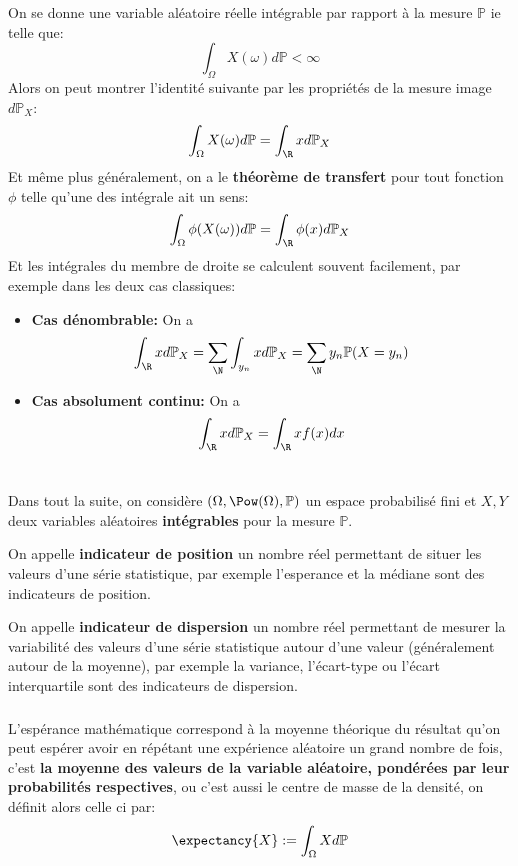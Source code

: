 \subsection*{}
On se donne une variable aléatoire réelle intégrable par rapport à la mesure \( \mathbb{P} \) ie telle que:
\[ 
   \int_\Omega X( \omega)d \mathbb{P} < \infty 
\] 
Alors on peut montrer l'identité suivante par les propriétés de la mesure image \( d \mathbb{P}_X \):
\[ 
   \int_\Omega X( \omega) d \mathbb{P} = \int_{\R} xd \mathbb{P}_X
\]
Et même plus généralement, on a le \textbf{théorème de transfert} pour tout fonction \( \phi \) telle qu'une des intégrale ait un sens:
\[ 
   \int_\Omega \phi(X( \omega)) d \mathbb{P} = \int_{\R} \phi(x)d \mathbb{P}_X
\]
Et les intégrales du membre de droite se calculent souvent facilement, par exemple dans les deux cas classiques:
\begin{itemize}
   \item \textbf{Cas dénombrable:} On a 
   \[ 
      \int_{\R} xd \mathbb{P}_X = \sum_\N \int_{y_n} xd \mathbb{P}_X = \sum_\N y_n \mathbb{P}(X = y_n)
   \]
   \item \textbf{Cas absolument continu:} On a 
   \[ 
      \int_{\R} xd \mathbb{P}_X = \int_{\R}xf(x)dx  
   \]
\end{itemize}
\chapter*{} %
Dans tout la suite, on considère \((\Omega, \Pow(\Omega), \mathbb{P})\) un espace probabilisé fini et \(X, Y\) deux variables aléatoires \textbf{intégrables} pour la mesure \( \mathbb{P} \). \<

On appelle \textbf{indicateur de position} un nombre réel permettant de situer les valeurs d'une série statistique, par exemple l'esperance et la médiane sont des indicateurs de position.\+

On appelle \textbf{indicateur de dispersion} un nombre réel permettant de mesurer la variabilité des valeurs d'une série statistique autour d'une valeur (généralement autour de la moyenne), par exemple la variance, l'écart-type ou l'écart interquartile sont des indicateurs de dispersion.

\subsection*{}
L'espérance mathématique correspond à la moyenne théorique du résultat qu'on peut espérer avoir en répétant une expérience aléatoire un grand nombre de fois, c'est \textbf{la moyenne des valeurs de la variable aléatoire, pondérées par leur probabilités respectives}, ou c'est aussi le centre de masse de la densité, on définit alors celle ci par:
\[
   \expectancy{X} := \int_\Omega X d\mathbb{P}
\]

